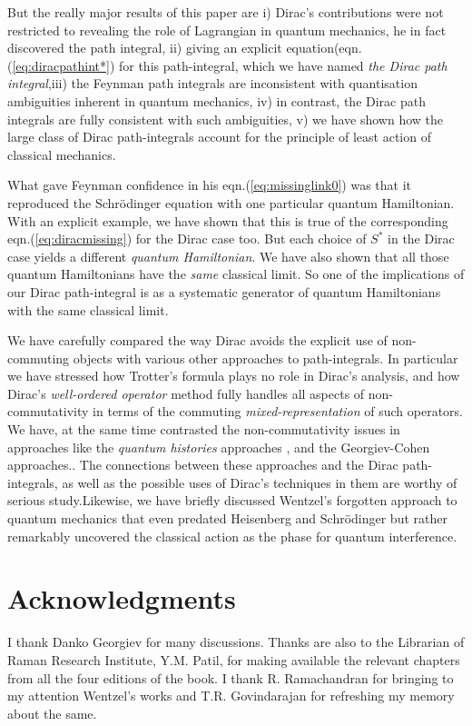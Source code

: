 \documentclass[12pt]{article}
\begin{document}
But the really major results of this paper are i) Dirac's contributions were not restricted to revealing the role of Lagrangian in
quantum mechanics, he in fact discovered the path integral, ii) giving an explicit equation(eqn.(\ref{eq:diracpathint*}) for this 
path-integral, which we have named \emph{the Dirac path integral},iii) the Feynman path integrals are inconsistent with quantisation ambiguities
inherent in quantum mechanics, iv) in contrast, the Dirac path integrals are fully consistent with such ambiguities, v) we have shown
how the large class of Dirac path-integrals account for the principle of least action of classical mechanics.

What gave Feynman confidence in his eqn.(\ref{eq:missinglink0}) was that it reproduced the Schr\"odinger equation with one particular quantum
Hamiltonian. With an explicit example, we
have shown that this is true of the corresponding eqn.(\ref{eq:diracmissing}) for the Dirac case too. But each choice of $S^*$ in the
Dirac case yields a different \emph{quantum Hamiltonian}. We have also shown that all those quantum Hamiltonians have the \emph{same}
classical limit. So one of the implications of our Dirac path-integral is as a systematic generator of quantum Hamiltonians with the
same classical limit.

We have carefully compared the way Dirac avoids the explicit use of non-commuting objects with various other approaches to path-integrals.
In particular we have stressed how Trotter's formula plays no role in Dirac's analysis, and how Dirac's \emph{well-ordered operator} method
fully handles all aspects of non-commutativity in terms of the commuting \emph{mixed-representation} of such operators. We have, at the same 
time contrasted the non-commutativity issues in approaches like the \emph{quantum histories} approaches \cite{griffiths}, and the 
Georgiev-Cohen \cite{histories} approaches.. The connections between these
approaches and the Dirac path-integrals, as well as the possible uses of Dirac's techniques in them are worthy of serious study.Likewise, we
have briefly discussed Wentzel's forgotten approach to quantum mechanics that even predated Heisenberg and Schr\"odinger but rather
remarkably uncovered the classical action as the phase for quantum interference.

\section{Acknowledgments}
I thank Danko Georgiev for many discussions.
Thanks are also to the Librarian of Raman Research Institute, Y.M. Patil, for making available the relevant
chapters from all the four editions of the book. I thank R. Ramachandran for bringing to my attention Wentzel's works and 
T.R. Govindarajan for refreshing my memory about the same. 
\end{document}
